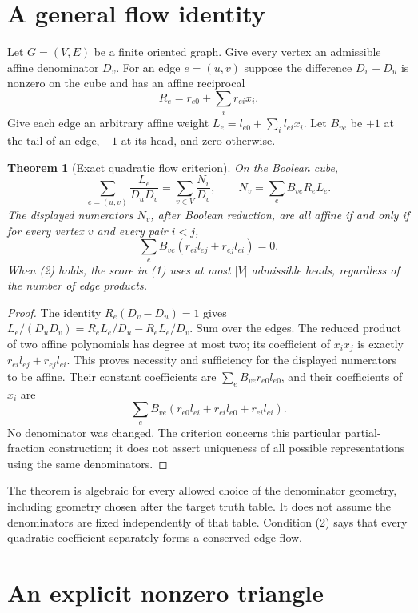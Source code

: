 \documentclass[11pt]{article}
\newtheorem{theorem}{Theorem}
\begin{document}
\section{A general flow identity}

Let $G=(V,E)$ be a finite oriented graph. Give every vertex an admissible
affine denominator $D_v$. For an edge $e=(u,v)$ suppose the difference
$D_v-D_u$ is nonzero on the cube and has an affine reciprocal
\[
 R_e=r_{e0}+\sum_i r_{ei}x_i.
\]
Give each edge an arbitrary affine weight
$L_e=l_{e0}+\sum_i l_{ei}x_i$. Let $B_{ve}$ be $+1$ at the tail of
an edge, $-1$ at its head, and zero otherwise.

\begin{theorem}[Exact quadratic flow criterion]\label{thm:flow}
On the Boolean cube,
\[
 \sum_{e=(u,v)}\frac{L_e}{D_uD_v}
 =\sum_{v\in V}\frac{N_v}{D_v},\qquad
 N_v=\sum_e B_{ve}R_eL_e.
 \tag{1}
\]
The displayed numerators $N_v$, after Boolean reduction, are all affine
if and only if for every vertex $v$ and every pair $i<j$,
\[
 \sum_e B_{ve}(r_{ei}l_{ej}+r_{ej}l_{ei})=0.
 \tag{2}
\]
When (2) holds, the score in (1) uses at most $|V|$ admissible heads,
regardless of the number of edge products.
\end{theorem}
\begin{proof}
The identity $R_e(D_v-D_u)=1$ gives
$L_e/(D_uD_v)=R_eL_e/D_u-R_eL_e/D_v$. Sum over the edges.
The reduced product of two affine polynomials has degree at most two;
its coefficient of $x_i x_j$ is exactly
$r_{ei}l_{ej}+r_{ej}l_{ei}$. This proves necessity and sufficiency
for the displayed numerators to be affine. Their constant coefficients
are $\sum_e B_{ve}r_{e0}l_{e0}$, and their coefficients of $x_i$ are
\[
 \sum_e B_{ve}
 (r_{e0}l_{ei}+r_{ei}l_{e0}+r_{ei}l_{ei}).
\]
No denominator was changed. The criterion concerns this particular
partial-fraction construction; it does not assert uniqueness of all
possible representations using the same denominators.
\end{proof}

The theorem is algebraic for every allowed choice of the denominator
geometry, including geometry chosen after the target truth table.
It does not assume the denominators are fixed independently of that
table. Condition (2) says that every quadratic coefficient separately
forms a conserved edge flow.

\section{An explicit nonzero triangle}
\end{document}
